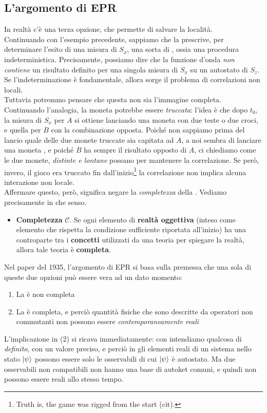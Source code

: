 \documentclass[../../FisicaTeorica.tex]{subfiles}
\begin{document}
\subsection{L'argomento di EPR}
In realtà c'è una terza opzione, che permette di salvare la località.\\
Continuando con l'esempio precedente, sappiamo che la \MQ prescrive, per determinare l'esito di una misura di $S_x$, una sorta di , ossia una procedura indeterministica. Precisamente, possiamo dire che la funzione d'onda \textit{non contiene} un risultato definito per una singola misura di $S_x$ su un autostato di $S_z$. Se l'indeterminazione è fondamentale, allora sorge il problema di correlazioni non locali.\\
Tuttavia potremmo pensare che questa non sia l'immagine completa. Continuando l'analogia, la moneta potrebbe essere \textit{truccata}: l'idea è che dopo $t_0$, la misura di $S_x$ per $A$ si ottiene lanciando una moneta con due teste o due croci, e quella per $B$ con la combinazione opposta. Poiché non sappiamo prima del lancio quale delle due monete truccate sia capitata ad $A$, a noi sembra di lanciare una moneta , e poiché $B$ ha sempre il risultato opposto di $A$, ci chiediamo come le due monete, \textit{distinte e lontane} possano  per mantenere la correlazione. Se però, invero, il gioco era truccato fin dall'inizio\footnote{Truth is, the game was rigged from the start (cit).} la correlazione non implica alcuna interazione non locale.\\
Affermare questo, però, significa negare la \textit{completezza} della \MQ. Vediamo precisamente in che senso.\\


\begin{itemize}
\item \textbf{Completezza} $\mathcal{C}$. Se ogni elemento di \textbf{realtà oggettiva} (inteso come elemento che rispetta la condizione sufficiente riportata all'inizio) ha una controparte tra i \textbf{concetti} utilizzati da una teoria per spiegare la realtà, allora tale teoria è \textbf{completa}.
\end{itemize}

Nel paper del 1935, l'argomento di EPR si basa sulla premessa che una sola di queste due opzioni può essere vera ad un dato momento:
\begin{enumerate}
\item La \MQ è non completa
\item La \MQ è completa, e perciò quantità fisiche che sono descritte da operatori non commutanti non possono essere \textit{contemporaneamente reali}
\end{enumerate}
L'implicazione in (2) si ricava immediatamente: con  intendiamo qualcosa di \textit{definito}, con un valore preciso, e perciò in \MQ gli elementi reali di un sistema nello stato $\Ket{\psi}$ possono essere solo le osservabili di cui $\Ket{\psi}$ è autostato. Ma due osservabili non compatibili non hanno una base di autoket comuni, e quindi non possono essere reali allo stesso tempo.\\
\end{document}
